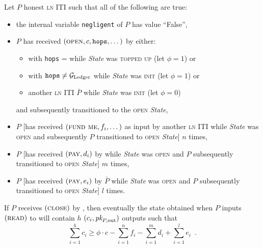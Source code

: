 \begin{lemma}
  Let $P$ honest \textsc{ln} ITI such that all of the following are true:
  \begin{itemize}
    \item the internal variable \texttt{negligent} of $P$ has value ``False'',
    \item $P$ has received $(\textsc{open}, c, \texttt{hops}, \dots)$ by either:
    \begin{itemize}
      \item \environment with \texttt{hops} = \ledger while \textit{State} was
      \textsc{topped up} (let $\phi = 1$) or
      \item \environment with $\texttt{hops} \neq \mathcal{G}_{\mathrm{Ledger}}$ while \textit{State}
      was \textsc{init} (let $\phi = 1$) or
      \item another \textsc{ln} ITI $\bar{P}$ while \textit{State} was
      \textsc{init} (let $\phi = 0$)
    \end{itemize}
    and subsequently transitioned to the \textsc{open} \textit{State},
    \item $P$ [has received $(\textsc{fund me}, f_i, \dots)$ as input by another
    \textsc{ln} ITI while \textit{State} was \textsc{open} and subsequently $P$
    transitioned to \textsc{open} \textit{State}] $n$ times,
    \item $P$ [has received $(\textsc{pay}, d_i)$ by \environment while
    \textit{State} was \textsc{open} and $P$ subsequently transitioned to
    \textsc{open} \textit{State}] $m$ times,
    \item $P$ [has received $(\textsc{pay}, e_i)$ by $\bar{P}$ while
    \textit{State} was \textsc{open} and $P$ subsequently transitioned to
    \textsc{open} \textit{State}] $l$ times.
  \end{itemize}
  If $P$ receives $(\textsc{close})$ by \environment, then eventually the state
  obtained when $P$ inputs $(\textsc{read})$ to \ledger will contain $h$ $(c_i,
  \textit{pk}_{P, \mathrm{out}})$ outputs such that
  \begin{equation}
    \sum\limits_{i=1}^h c_i \geq \phi \cdot c - \sum\limits_{i=1}^n f_i -
    \sum\limits_{i=1}^m d_i + \sum\limits_{i=1}^l e_i \enspace.
  \end{equation}
\end{lemma}

